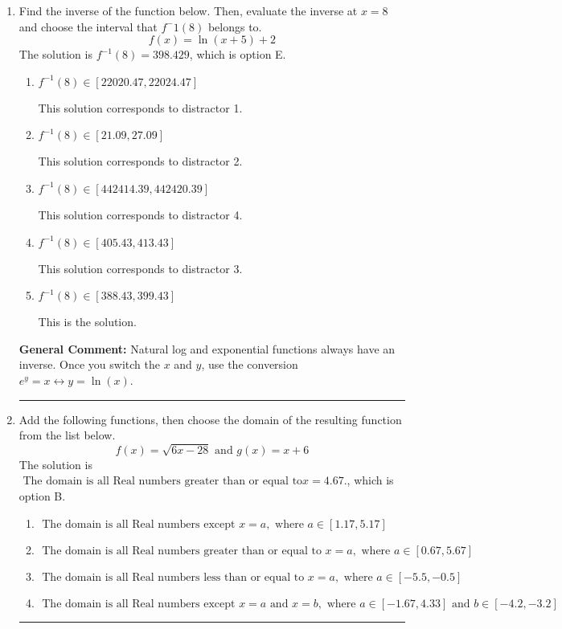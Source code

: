 \documentclass{extbook}[14pt]
\newcommand{\litem}[1]{\item #1

\rule{\textwidth}{0.4pt}}
\begin{document}
\begin{enumerate}\litem{
Find the inverse of the function below. Then, evaluate the inverse at $x = 8$ and choose the interval that $f^-1(8)$ belongs to.
\[ f(x) = \ln{(x+5)}+2 \]The solution is \( f^{-1}(8) = 398.429 \), which is option E.\begin{enumerate}[label=\Alph*.]
\item \( f^{-1}(8) \in [22020.47, 22024.47] \)

 This solution corresponds to distractor 1.
\item \( f^{-1}(8) \in [21.09, 27.09] \)

 This solution corresponds to distractor 2.
\item \( f^{-1}(8) \in [442414.39, 442420.39] \)

 This solution corresponds to distractor 4.
\item \( f^{-1}(8) \in [405.43, 413.43] \)

 This solution corresponds to distractor 3.
\item \( f^{-1}(8) \in [388.43, 399.43] \)

 This is the solution.
\end{enumerate}

\textbf{General Comment:} Natural log and exponential functions always have an inverse. Once you switch the $x$ and $y$, use the conversion $ e^y = x \leftrightarrow y=\ln(x)$.
}
\litem{
Add the following functions, then choose the domain of the resulting function from the list below.
\[ f(x) = \sqrt{6x-28}  \text{ and } g(x) = x + 6 \]The solution is \( \text{ The domain is all Real numbers greater than or equal to} x = 4.67. \), which is option B.\begin{enumerate}[label=\Alph*.]
\item \( \text{ The domain is all Real numbers except } x = a, \text{ where } a \in [1.17, 5.17] \)


\item \( \text{ The domain is all Real numbers greater than or equal to } x = a, \text{ where } a \in [0.67, 5.67] \)


\item \( \text{ The domain is all Real numbers less than or equal to } x = a, \text{ where } a \in [-5.5, -0.5] \)


\item \( \text{ The domain is all Real numbers except } x = a \text{ and } x = b, \text{ where } a \in [-1.67, 4.33] \text{ and } b \in [-4.2, -3.2] \)



\end{enumerate}}
\end{enumerate}
\end{document}
